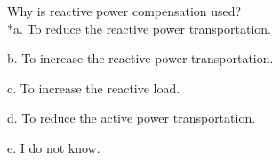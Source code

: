 
Why is reactive power compensation used?\\

*a. To reduce the reactive power transportation.

b. To increase the reactive power transportation.

c. To increase the reactive load.

d. To reduce the active power transportation.

e. I do not know.\\
